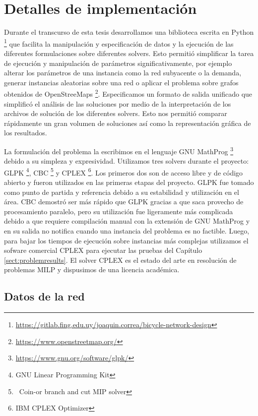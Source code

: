 \chapter{Detalles de implementación}

Durante el transcurso de esta tesis desarrollamos una biblioteca escrita en Python \footnote{\url{https://gitlab.fing.edu.uy/joaquin.correa/bicycle-network-design}} que facilita la manipulación y especificación de datos y la ejecución de las diferentes formulaciones sobre diferentes solvers. Esto permitió simplificar la tarea de ejecución y manipulación de parámetros significativamente, por ejemplo alterar los parámetros de una instancia como la red subyacente o la demanda, generar instancias aleatorias sobre una red o aplicar el problema sobre grafos obtenidos de OpenStreeMaps \footnote{\url{https://www.openstreetmap.org/}}. Especificamos un formato de salida unificado que simplificó el análisis de las soluciones por medio de la interpretación de los archivos de solución de los diferentes solvers. Esto nos permitió comparar rápidamente un gran volumen de soluciones así como la representación gráfica de los resultados.

La formulación del problema la escribimos en el lenguaje GNU MathProg \footnote{\url{https://www.gnu.org/software/glpk/}} debido a su simpleza y expresividad. Utilizamos tres solvers durante el proyecto: GLPK \footnote{GNU Linear Programming Kit}, CBC \footnote{\ Coin-or branch and cut MIP solver} y CPLEX \footnote{IBM CPLEX Optimizer}. Los primeros dos son de acceso libre y de código abierto y fueron utilizados en las primeras etapas del proyecto. GLPK fue tomado como punto de partida y referencia debido a su estabilidad y utilización en el área. CBC demostró ser más rápido que GLPK gracias a que saca provecho de procesamiento paralelo, pero su utilización fue ligeramente más complicada debido a que requiere compilación manual con la extensión de GNU MathProg y en su salida no notifica cuando una instancia del problema es no factible. Luego, para bajar los tiempos de ejecución sobre instancias más complejas utilizamos el sofware comercial CPLEX para ejecutar las pruebas del Capítulo \ref{sect:problemresults}. El solver CPLEX es el estado del arte en resolución de problemas MILP y dispusimos de una licencia académica.

\section*{Datos de la red}
\label{sect:costcalculation}

